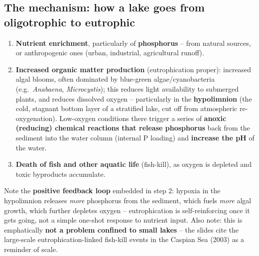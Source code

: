 \documentclass[11pt,a4paper]{article}
\begin{document}
\subsection{The mechanism: how a lake goes from oligotrophic to eutrophic}
\begin{enumerate}[leftmargin=1.5em]
\item \textbf{Nutrient enrichment}, particularly of \textbf{phosphorus} -- from natural sources, or anthropogenic ones (urban, industrial, agricultural runoff).
\item \textbf{Increased organic matter production} (eutrophication proper): increased algal blooms, often dominated by blue-green algae/cyanobacteria (e.g.\ \textit{Anabaena}, \textit{Microcystis}); this reduces light availability to submerged plants, and reduces dissolved oxygen -- particularly in the \textbf{hypolimnion} (the cold, stagnant bottom layer of a stratified lake, cut off from atmospheric re-oxygenation). Low-oxygen conditions there trigger a series of \textbf{anoxic (reducing) chemical reactions that release phosphorus} back from the sediment into the water column (internal P loading) and \textbf{increase the pH} of the water.
\item \textbf{Death of fish and other aquatic life} (fish-kill), as oxygen is depleted and toxic byproducts accumulate.
\end{enumerate}

\begin{exambox}
Note the \textbf{positive feedback loop} embedded in step 2: hypoxia in the hypolimnion releases \emph{more} phosphorus from the sediment, which fuels \emph{more} algal growth, which further depletes oxygen -- eutrophication is self-reinforcing once it gets going, not a simple one-shot response to nutrient input. Also note: this is emphatically \textbf{not a problem confined to small lakes} -- the slides cite the large-scale eutrophication-linked fish-kill events in the Caspian Sea (2003) as a reminder of scale.
\end{exambox}
\end{document}
